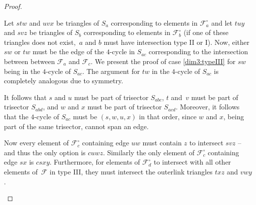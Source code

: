 \documentclass[a4paper,12pt]{amsart}
\newcommand{\ngon}[8]{ %

  \foreach \t in {1,...,#1} {
    \coordinate (#7\t) at ($#2+(#8-\t*360/#1:#3)$);
  }

  \foreach \x/\y/\z in {#4}{
    \draw[thick,\z,shorten <=#5pt, shorten >=#5pt] {(#7\x)--(#7\y)};
  }

  \setcounter{intege}{1}
  \pgfmathsetcounter{intege}{1}
  \foreach \object in {#6}{
    \node[inner sep=0pt] at (#7\theintege) {\object};
    \pgfmathsetcounter{intege}{\theintege+1}
    \setcounter{intege}{\theintege}
  }
}
\newcounter{intege}
\theoremstyle{plain}
\theoremstyle{definition}
\newcommand{\family}{\mathcal F}
\begin{document}
\begin{proof}
\begin{enumerate}
\medskip

Let $stw$ and $uvx$ be triangles of $S_a$ corresponding to elements in $\family_a^\circ$ and let $tuy$ and $svz$ be triangles of $S_b$ corresponding to elements in $\family_b^\circ$ (if one of these triangles does not exist,~$a$ and $b$ must have intersection type II or I). Now, either $sw$ or $tw$ must be the edge of the $4$-cycle in $S_{ac}$ corresponding to the intersection between between $\family_a$ and $\family_c$. We present the proof of case \eqref{dim3:typeIII} for $sw$ being in the $4$-cycle of $S_{ac}$. The argument for $tw$ in the $4$-cycle of $S_{ac}$ is completely analogous due to symmetry.

It follows that $s$ and $u$ must be part of trisector $S_{abc}$, $t$ and~$v$ must be part of trisector $S_{abd}$, and $w$ and $x$ must be part of trisector $S_{acd}$. Moreover, it follows that the $4$-cycle of $S_{ac}$ must be $(s,w,u,x)$ in that order, since $w$ and $x$, being part of the same trisector, cannot span an edge.

Now every element of $\family_c^\circ$ containing edge $uw$ must contain $z$ to intersect $svz$ -- and thus the only option is $cuwz$. Similarly the only element of $\family_c^\circ$ containing edge $sx$ is $csxy$. Furthermore, for elements of $\family_d^\circ$ to intersect with all other elements of~$\family$ in type III, they must intersect the outerlink triangles $txz$ and $vwy$.

\begin{figure}
  \begin{center}
\end{center}
\end{figure}
\end{enumerate}
\end{proof}
\end{document}
